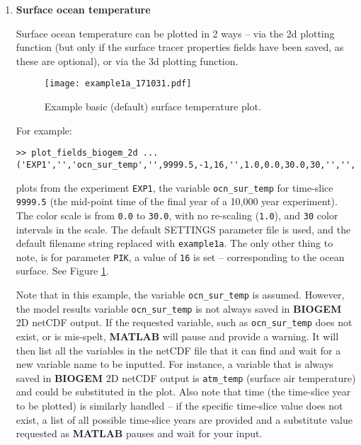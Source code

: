 \documentclass[11pt,fleqn]{book} %
\begin{document}
\begin{enumerate}[noitemsep]

\vspace{4pt}
\item \textbf{Surface ocean temperature}

Surface ocean temperature can be plotted in 2 ways -- via the 2d plotting function (but only if the surface tracer properties fields have been saved, as these are optional), or via the 3d plotting function.

\begin{figure}[ht]
\begin{center}
\texttt{[image: example1a\_171031.pdf]}
\end{center}
\vspace{-4mm}
\caption{Example basic (default) surface temperature plot.}
\label{fig:example1a}
\end{figure}

For example:

\footnotesize
\vspace{-0pt}\begin{verbatim}
>> plot_fields_biogem_2d ...
('EXP1','','ocn_sur_temp','',9999.5,-1,16,'',1.0,0.0,30.0,30,'','','example1a');
\end{verbatim}\vspace{-0pt}
\normalsize
plots from the experiment \texttt{EXP1}, the variable \texttt{ocn\_sur\_temp} for time-slice \texttt{9999.5} (the mid-point time of the final year of a 10,000 year experiment). The color scale is from \texttt{0.0} to \texttt{30.0}, with no re-scaling (\texttt{1.0}), and \texttt{30} color intervals in the scale. The default \footnotesize\textsf{SETTINGS }\normalsize parameter file is used, and the default filename string replaced with \texttt{example1a}. The only other thing to note, is for parameter \texttt{PIK}, a value of \texttt{16} is set -- corresponding to the ocean surface. See Figure \ref{fig:example1a}.

Note that in this example, the   variable \texttt{ocn\_sur\_temp} is assumed. However, the model results variable \texttt{ocn\_sur\_temp} is not always saved in \textbf{BIOGEM} 2D netCDF output. If the requested variable, such as \texttt{ocn\_sur\_temp} does not exist, or is mis-spelt, \textbf{MATLAB} will pause and provide a warning. It will then list all the variables in the netCDF file that it can find and wait for a new variable name to be inputted. For instance, a variable that is always saved in \textbf{BIOGEM} 2D netCDF output is \texttt{atm\_temp} (surface air temperature) and could be substituted in the plot. Also note that time (the time-slice year to be plotted) is similarly handled -- if the specific time-slice value does not exist, a list of all possible time-slice years are provided and a substitute value requested as \textbf{MATLAB} pauses and wait for your input.


\end{enumerate}
\end{document}
